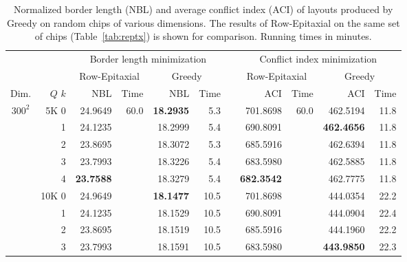 \begin{table}[p!]\centering
\caption{\label{tab:greedy}
  Normalized border length (NBL) and average conflict index (ACI) of layouts
  produced by Greedy on random chips of various dimensions. The results of
  Row-Epitaxial on the same set of chips (Table~\ref{tab:reptx}) is shown for
  comparison. Running times in minutes.}
\footnotesize{
\begin{tabular*}{\hsize}{crrrrrlrrrr}
\vspace{1pt}
     &         & \multicolumn{4}{c}{Border length minimization} & & \multicolumn{4}{c}{Conflict index minimization} \\ \cline{3-6} \cline{8-11}
\vspace{1pt}
     &         & \multicolumn{2}{c}{Row-Epitaxial} & \multicolumn{2}{c}{Greedy} & & \multicolumn{2}{c}{Row-Epitaxial} & \multicolumn{2}{c}{Greedy} \\
\vspace{1pt}
Dim. & $Q$ $k$ & NBL & Time & NBL & Time & & ACI & Time & ACI & Time \\
\hline
$300^2$         &  5K 0   &      24.9649  & 60.0 & {\bf 18.2935} &   5.3 &  &      701.8698  & 60.0 &      462.5194  &  11.8 \\
                &     1   &      24.1235  &      &      18.2999  &   5.4 &  &      690.8091  &      & {\bf 462.4656} &  11.8 \\
                &     2   &      23.8695  &      &      18.3072  &   5.3 &  &      685.5916  &      &      462.6394  &  11.8 \\
                &     3   &      23.7993  &      &      18.3226  &   5.4 &  &      683.5980  &      &      462.5885  &  11.8 \\
                &     4   & {\bf 23.7588} &      &      18.3279  &   5.4 &  & {\bf 682.3542} &      &      462.7775  &  11.8 \\
\cline{2-11}
                & 10K 0   &      24.9649  &      & {\bf 18.1477} &  10.5 &  &      701.8698  &      &      444.0354  &  22.2 \\
                &     1   &      24.1235  &      &      18.1529  &  10.5 &  &      690.8091  &      &      444.0904  &  22.4 \\
                &     2   &      23.8695  &      &      18.1519  &  10.5 &  &      685.5916  &      &      444.1960  &  22.2 \\
                &     3   &      23.7993  &      &      18.1591  &  10.5 &  &      683.5980  &      & {\bf 443.9850} &  22.3 \\

\end{tabular*}}
\end{table}
